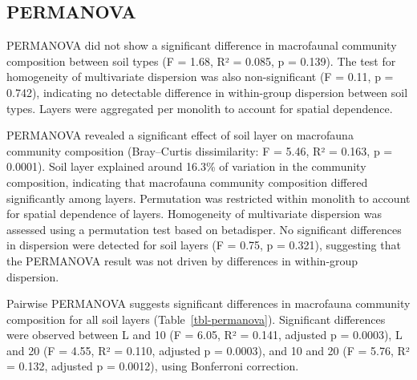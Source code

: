 \documentclass[
  american,
  11pt,
]{stylisharticle}
\begin{document}
\subsection{PERMANOVA}\label{permanova}

PERMANOVA did not show a significant difference in macrofaunal community
composition between soil types (F = 1.68, R² = 0.085, p = 0.139). The
test for homogeneity of multivariate dispersion was also non-significant
(F = 0.11, p = 0.742), indicating no detectable difference in
within-group dispersion between soil types. Layers were aggregated per
monolith to account for spatial dependence.

PERMANOVA revealed a significant effect of soil layer on macrofauna
community composition (Bray--Curtis dissimilarity: F = 5.46, R² = 0.163,
p = 0.0001). Soil layer explained around 16.3\% of variation in the
community composition, indicating that macrofauna community composition
differed significantly among layers. Permutation was restricted within
monolith to account for spatial dependence of layers. Homogeneity of
multivariate dispersion was assessed using a permutation test based on
betadisper. No significant differences in dispersion were detected for
soil layers (F = 0.75, p = 0.321), suggesting that the PERMANOVA result
was not driven by differences in within-group dispersion.

Pairwise PERMANOVA suggests significant differences in macrofauna
community composition for all soil layers (Table~\ref{tbl-permanova}).
Significant differences were observed between L and 10 (F = 6.05, R² =
0.141, adjusted p = 0.0003), L and 20 (F = 4.55, R² = 0.110, adjusted p
= 0.0003), and 10 and 20 (F = 5.76, R² = 0.132, adjusted p = 0.0012),
using Bonferroni correction.

\begin{table}

\caption{\label{tbl-permanova}Pairwise PERMANOVA for community
composition comparisons between layers.}


\end{table}%
\end{document}

